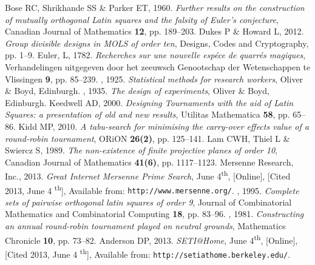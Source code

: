 \documentclass[11pt, a4paper]{article}
\newcounter{ls}
\begin{document}
 {\footnotesize
\begin{thebibliography}{xx}
 {{\sc  Bose RC,    Shrikhande SS \&  Parker ET}, 1960. {\em Further results on the construction of mutually orthogonal Latin squares and the falsity of Euler’s conjecture}, Canadian  Journal of  Mathematics {\bf 12}, pp. 189--203.}
 {{\sc  Dukes P  \& Howard L}, 2012. {\em Group divisible designs in MOLS of order ten}, Designs, Codes and Cryptography,  pp. 1--9.}
 {{\sc Euler, L}, 1782. {\em Recherches sur une nouvelle esp\'ece de quarr\'es magiques}, Verhandelingen uitgegeven door het zeeuwsch Genootschap der Wetenschappen te Vlissingen {\bf 9}, pp. 85--239.}
, 1925. {\em Statistical methods for research workers}, Oliver \& Boyd, Edinburgh.
, 1935. {\em The design of experiments}, Oliver \& Boyd, Edinburgh.
 {{\sc Keedwell AD}, 2000. {\em Designing Tournaments with the aid of Latin Squares: a presentation of old and new results}, Utilitas Mathematica {\bf 58}, pp. 65--86.}
 {{\sc Kidd MP}, 2010. {\em A tabu-search for minimising the carry-over effects value of a round-robin tournament}, ORiON {\bf 26(2)}, pp. 125--141.}
 {{\sc  Lam CWH, Thiel L \& Swiercz S}, 1989. {\em The non-existence of finite projective planes of order 10}, Canadian  Journal of  Mathematics {\bf 41(6)}, pp. 1117--1123.}
 {\sc Mersenne Research, Inc.}, 2013. {\em Great Internet Mersenne Prime Search},  June 4\textsuperscript{th}, [Online], [Cited 2013, June 4 \textsuperscript{th}], Available from: {\tt http://www.mersenne.org/}.
, 1995. {\em Complete sets of pairwise orthogonal latin squares of order 9}, Journal of Combinatorial Mathematics and Combinatorial Computing {\bf 18}, pp. 83--96.
, 1981. {\em Constructing an annual round-robin tournament played on neutral grounds}, Mathematics Chronicle {\bf 10}, pp. 73--82.
 {\sc Anderson DP}, 2013. {\em SETI@Home},  June 4\textsuperscript{th}, [Online], [Cited 2013, June 4 \textsuperscript{th}], Available from: {\tt http://setiathome.berkeley.edu/}.
 
\end{thebibliography}}



\end{document}
